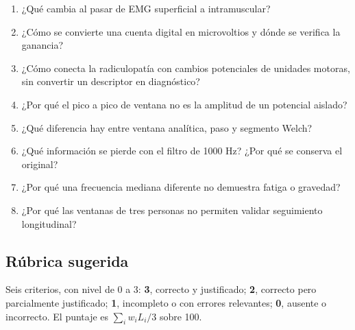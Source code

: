 \documentclass[
  spanish,
  10.5pt,
  a4paper,
  DIV=11,
  numbers=noendperiod]{scrartcl}
\providecommand{\tightlist}{%
  \setlength{\itemsep}{0pt}\setlength{\parskip}{0pt}}
\begin{document}
\begin{enumerate}
\def\labelenumi{\arabic{enumi}.}
\tightlist
\item
  ¿Qué cambia al pasar de EMG superficial a intramuscular?
\item
  ¿Cómo se convierte una cuenta digital en microvoltios y dónde se
  verifica la ganancia?
\item
  ¿Cómo conecta la radiculopatía con cambios potenciales de unidades
  motoras, sin convertir un descriptor en diagnóstico?
\item
  ¿Por qué el pico a pico de ventana no es la amplitud de un potencial
  aislado?
\item
  ¿Qué diferencia hay entre ventana analítica, paso y segmento Welch?
\item
  ¿Qué información se pierde con el filtro de 1000 Hz? ¿Por qué se
  conserva el original?
\item
  ¿Por qué una frecuencia mediana diferente no demuestra fatiga o
  gravedad?
\item
  ¿Por qué las ventanas de tres personas no permiten validar seguimiento
  longitudinal?
\end{enumerate}

\subsection{Rúbrica sugerida}\label{ruxfabrica-sugerida}

Seis criterios, con nivel de 0 a 3: \textbf{3}, correcto y justificado;
\textbf{2}, correcto pero parcialmente justificado; \textbf{1},
incompleto o con errores relevantes; \textbf{0}, ausente o incorrecto.
El puntaje es \(\sum_i w_iL_i/3\) sobre 100.

\end{document}
